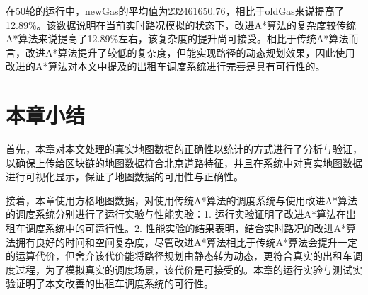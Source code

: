在50轮的运行中，newGas的平均值为232461650.76，相比于oldGas来说提高了12.89\%。该数据说明在当前实时路况模拟的状态下，改进A*算法的复杂度较传统A*算法来说提高了12.89\%左右，该复杂度的提升尚可接受。相比于传统A*算法而言，改进A*算法提升了较低的复杂度，但能实现路径的动态规划效果，因此使用改进的A*算法对本文中提及的出租车调度系统进行完善是具有可行性的。

\section{本章小结}

首先，本章对本文处理的真实地图数据的正确性以统计的方式进行了分析与验证，以确保上传给区块链的地图数据符合北京道路特征，并且在系统中对真实地图数据进行可视化显示，保证了地图数据的可用性与正确性。

接着，本章使用方格地图数据，对使用传统A*算法的调度系统与使用改进A*算法的调度系统分别进行了运行实验与性能实验：1. 运行实验证明了改进A*算法在出租车调度系统中的可运行性。2. 性能实验的结果表明，结合实时路况的改进A*算法拥有良好的时间和空间复杂度，尽管改进A*算法相比于传统A*算法会提升一定的运算代价，但舍弃该代价能将路径规划由静态转为动态，更符合真实的出租车调度过程，为了模拟真实的调度场景，该代价是可接受的。本章的运行实验与测试实验证明了本文改善的出租车调度系统的可行性。

